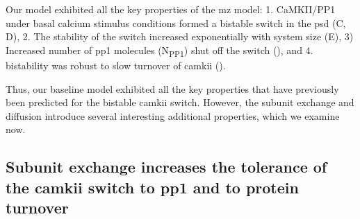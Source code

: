 \documentclass[9pt,lineno,doublespacing]{elife}
\newcommand\SUB[2]{#1\textsubscript{#2}}
\begin{document}
Our model exhibited all the key properties of the \gls{mz} model: 1. CaMKII/PP1
under basal calcium stimulus conditions formed a bistable switch in the
\gls{psd} (C, D), 2. The stability of the switch
increased exponentially with system size (E), 3)
Increased number of \gls{pp1} molecules (\SUB{N}{PP1}) shut off the switch
(), and 4. bistability was robust to slow turnover
of \gls{camkii} ().

Thus, our baseline model exhibited all the key properties that have
previously been predicted for the bistable \gls{camkii} switch. However, the
subunit exchange and diffusion introduce several interesting additional
properties, which we examine now.

\subsection{Subunit exchange increases the tolerance of the \gls{camkii} switch
to \gls{pp1} and to protein turnover}\label{subsec:result_tolerance}
\end{document}
